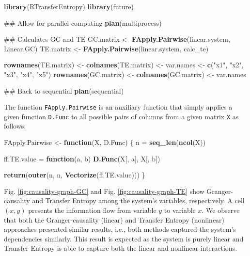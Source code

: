 \documentclass[]{book}
\newenvironment{Shaded}{\begin{snugshade}}{\end{snugshade}}
\newcommand{\KeywordTok}[1]{\textcolor[rgb]{0.13,0.29,0.53}{\textbf{#1}}}
\newcommand{\StringTok}[1]{\textcolor[rgb]{0.31,0.60,0.02}{#1}}
\newcommand{\ControlFlowTok}[1]{\textcolor[rgb]{0.13,0.29,0.53}{\textbf{#1}}}
\newcommand{\NormalTok}[1]{#1}
\theoremstyle{definition}
\theoremstyle{definition}
\theoremstyle{definition}
\theoremstyle{remark}
\begin{document}
\begin{Shaded}
\begin{Highlighting}[]
\KeywordTok{library}\NormalTok{(RTransferEntropy)}
\KeywordTok{library}\NormalTok{(future)}

\NormalTok{## Allow for parallel computing}
\KeywordTok{plan}\NormalTok{(multiprocess)}

\NormalTok{## Calculates GC and TE}
\NormalTok{GC.matrix <-}\StringTok{ }\KeywordTok{FApply.Pairwise}\NormalTok{(linear.system, Linear.GC)}
\NormalTok{TE.matrix <-}\StringTok{ }\KeywordTok{FApply.Pairwise}\NormalTok{(linear.system, calc_te)}

\KeywordTok{rownames}\NormalTok{(TE.matrix) <-}\StringTok{ }\KeywordTok{colnames}\NormalTok{(TE.matrix) <-}\StringTok{ }\NormalTok{var.names <-}\StringTok{ }\KeywordTok{c}\NormalTok{(}\StringTok{"x1"}\NormalTok{, }
  \StringTok{"x2"}\NormalTok{, }\StringTok{"x3"}\NormalTok{, }\StringTok{"x4"}\NormalTok{, }\StringTok{"x5"}\NormalTok{)}
\KeywordTok{rownames}\NormalTok{(GC.matrix) <-}\StringTok{ }\KeywordTok{colnames}\NormalTok{(GC.matrix) <-}\StringTok{ }\NormalTok{var.names}

\NormalTok{## Back to sequential}
\KeywordTok{plan}\NormalTok{(sequential)}
\end{Highlighting}
\end{Shaded}

The function \texttt{FApply.Pairwise} is an auxiliary function that
simply applies a given function \texttt{D.Func} to all possible pairs of
columns from a given matrix \texttt{X} as follows:

\begin{Shaded}
\begin{Highlighting}[]
\NormalTok{FApply.Pairwise <-}\StringTok{ }\ControlFlowTok{function}\NormalTok{(X, D.Func) \{}
\NormalTok{  n =}\StringTok{ }\KeywordTok{seq_len}\NormalTok{(}\KeywordTok{ncol}\NormalTok{(X))}
  
\NormalTok{  ff.TE.value =}\StringTok{ }\ControlFlowTok{function}\NormalTok{(a, b) }\KeywordTok{D.Func}\NormalTok{(X[, a], X[, b])}
  
  \KeywordTok{return}\NormalTok{(}\KeywordTok{outer}\NormalTok{(n, n, }\KeywordTok{Vectorize}\NormalTok{(ff.TE.value)))}
\NormalTok{\}}
\end{Highlighting}
\end{Shaded}

Fig. \ref{fig:causality-graph-GC} and Fig. \ref{fig:causality-graph-TE}
show Granger-causality and Transfer Entropy among the system's
variables, respectively. A cell \((x, y)\) presents the information flow
from variable \(y\) to variable \(x\). We observe that both the
Granger-causality (linear) and Transfer Entropy (nonlinear) approaches
presented similar results, i.e., both methods captured the system's
dependencies similarly. This result is expected as the system is purely
linear and Transfer Entropy is able to capture both the linear and
nonlinear interactions.
\end{document}
